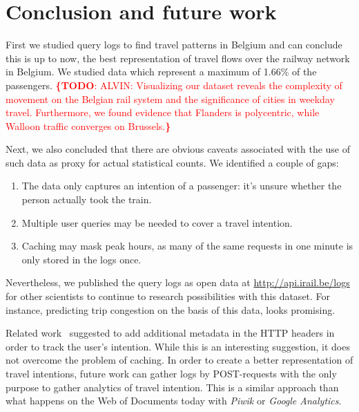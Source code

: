 \documentclass{sig-alternate}
\newcommand{\todo}[1]{\noindent\textcolor{red}{{\bf \{TODO}: #1{\bf \}}}}
\begin{document}
\section{Conclusion and future work}
\label{sec:conclusion}

First we studied query logs to find travel patterns in Belgium and can conclude this is up to now, the best representation of travel flows over the railway network in Belgium. %
We studied data which represent a maximum of 1.66\% of the passengers.
\todo{ALVIN: Visualizing our dataset reveals the complexity of movement on the Belgian rail system and the significance of cities in weekday travel.
Furthermore, we found evidence that Flanders is polycentric, while Walloon traffic converges on Brussels.}

Next, we also concluded that there are obvious caveats associated with the use of such data as proxy for actual statistical counts. 
We identified a couple of gaps:
\begin{enumerate}
  \item The data only captures an intention of a passenger: it's unsure whether the person actually took the train.
  \item Multiple user queries may be needed to cover a travel intention.
  \item Caching may mask peak hours, as many of the same requests in one minute is only stored in the logs once.
\end{enumerate}
Nevertheless, we published the query logs as open data at \url{http://api.irail.be/logs} for other scientists to continue to research possibilities with this dataset.
For instance, predicting trip congestion on the basis of this data, looks promising. %

Related work~\cite{verborgh2014lonesome} suggested to add additional metadata in the HTTP headers in order to track the user's intention.
While this is an interesting suggestion, it does not overcome the problem of caching.
In order to create a better representation of travel intentions, future work can gather logs by POST-requests with the only purpose to gather analytics of travel intention.
This is a similar approach than what happens on the Web of Documents today with \emph{Piwik} or \emph{Google Analytics}.

\let\oldsection\section
\renewcommand{\section}[2][1]{\oldsection{#1}\vspace{-3pt}}



\end{document}
